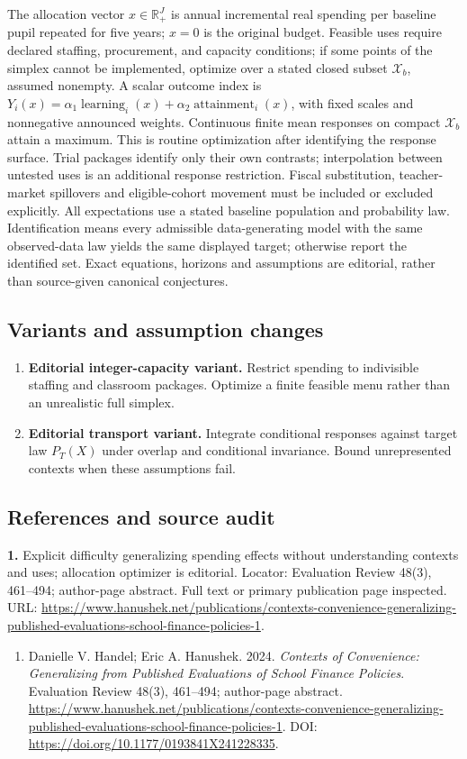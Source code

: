 \documentclass[11pt,a4paper]{article}
\begin{document}
The allocation vector \(x\in\mathbb R_+^J\) is annual incremental real spending per baseline pupil repeated for five years; \(x=0\) is the original budget. Feasible uses require declared staffing, procurement, and capacity conditions; if some points of the simplex cannot be implemented, optimize over a stated closed subset \(\mathcal X_b\), assumed nonempty. A scalar outcome index is \(Y_i(x)=\alpha_1\operatorname{learning}_i(x)+\alpha_2\operatorname{attainment}_i(x)\), with fixed scales and nonnegative announced weights. Continuous finite mean responses on compact \(\mathcal X_b\) attain a maximum. This is routine optimization after identifying the response surface. Trial packages identify only their own contrasts; interpolation between untested uses is an additional response restriction. Fiscal substitution, teacher-market spillovers and eligible-cohort movement must be included or excluded explicitly. All expectations use a stated baseline population and probability law. Identification means every admissible data-generating model with the same observed-data law yields the same displayed target; otherwise report the identified set. Exact equations, horizons and assumptions are editorial, rather than source-given canonical conjectures.
\subsection*{Variants and assumption changes}
\begin{enumerate}
\item \textbf{Editorial integer-capacity variant.} Restrict spending to indivisible staffing and classroom packages. Optimize a finite feasible menu rather than an unrealistic full simplex.
\item \textbf{Editorial transport variant.} Integrate conditional responses against target law \(P_T(X)\) under overlap and conditional invariance. Bound unrepresented contexts when these assumptions fail.
\end{enumerate}
\subsection*{References and source audit}
\textbf{1.} Explicit difficulty generalizing spending effects without understanding contexts and uses; allocation optimizer is editorial. Locator: Evaluation Review 48(3), 461–494; author-page abstract. Full text or primary publication page inspected. URL: \url{https://www.hanushek.net/publications/contexts-convenience-generalizing-published-evaluations-school-finance-policies-1}.
\begin{enumerate}\raggedright
\item\hypertarget{definitions:source:30007734:1}{} Danielle V. Handel; Eric A. Hanushek. 2024. \emph{Contexts of Convenience: Generalizing from Published Evaluations of School Finance Policies}. Evaluation Review 48(3), 461–494; author-page abstract.
\url{https://www.hanushek.net/publications/contexts-convenience-generalizing-published-evaluations-school-finance-policies-1}.
DOI: \url{https://doi.org/10.1177/0193841X241228335}.
\end{enumerate}
\end{document}
